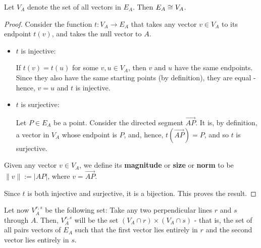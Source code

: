 \begin{lemma}
	Let $V_A$ denote the set of all vectors in $E_A$. Then $E_A\cong V_A$.
\end{lemma}
\begin{proof}
	Consider the function $t:V_A\to E_A$ that takes any vector $v\in V_A$ to its endpoint $t(v)$, and takes the null vector to $A$.
	
	\begin{itemize}
		\item $t$ is injective:
		
		If $t(v)=t(u)$ for some $v,u\in V_A$, then $v$ and $u$ have the same endpoints. Since they also have the same starting points (by definition), they are equal - hence, $v=u$ and $t$ is injective.
		
		\item $t$ is surjective:
		
		Let $P\in E_A$ be a point. Consider the directed segment $\overrightarrow{AP}$. It is, by definition, a vector in $V_A$ whose endpoint is $P$, and, hence, $t(\overrightarrow{AP})=P$, and so $t$ is surjective.
	\end{itemize}

\begin{df}
	Given any vector $v\in V_A$, we define its \textbf{magnitude} or \textbf{size} or \textbf{norm} to be $\lVert v\rVert:=\lvert AP\rvert$, where $v=\overrightarrow{AP}$.
\end{df}

Since $t$ is both injective and surjective, it is a bijection. This proves the result.
\end{proof}

Let now $V^{r,s}_A$ be the following set: Take any two perpendicular lines $r$ and $s$ through $A$. Then, $V^{r,s}_A$ will be the set $(V_A\cap r)\times (V_A\cap s)$ - that is, the set of all pairs vectors of $E_A$ such that the first vector lies entirely in $r$ and the second vector lies entirely in $s$.

